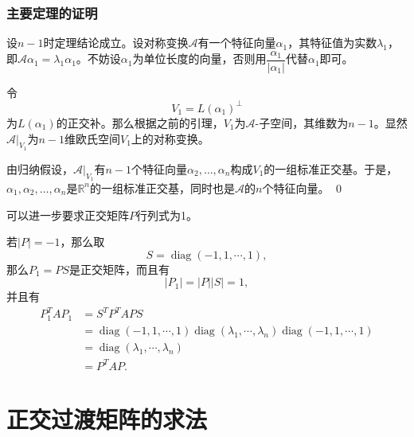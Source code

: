 \begin{frame}
\frametitle{主要定理的证明}

\startproof[bg=yellow, fg=red]
\phantom{一一}设$n-1$时定理结论成立。设对称变换$\mathscr{A}$有一个特征向量$\alpha_1$，其特征值为实数$\lambda_1$，即$\mathscr{A}\alpha_1 = \lambda_1\alpha_1$。不妨设$\alpha_1$为单位长度的向量，否则用$\displaystyle \dfrac{\alpha_1}{\lvert \alpha_1 \rvert}$代替$\alpha_1$即可。

\vspace{0.6em}
\pause

\phantom{一一}令
\[V_1 = L(\alpha_1)^\perp\]
为$L(\alpha_1)$的正交补。那么根据之前的引理，$V_1$为$\mathscr{A}$-子空间，其维数为$n-1$。显然$\mathscr{A}|_{V_1}$为$n-1$维欧氏空间$V_1$上的对称变换。

\vspace{0.6em}
\pause

\phantom{一一}由归纳假设，$\mathscr{A}|_{V_1}$有$n-1$个特征向量$\alpha_2,\ldots,\alpha_n$构成$V_1$的一组标准正交基。于是，$\alpha_1,\alpha_2,\ldots,\alpha_n$是$\mathbb{R}^n$的一组标准正交基，同时也是$\mathscr{A}$的$n$个特征向量。
\qed

\end{frame}


\begin{frame}

\begin{remark}
可以进一步要求正交矩阵$P$行列式为1。

\pause

若$\lvert P \rvert = -1$，那么取
\[S = \operatorname{diag}(-1,1,\cdots,1),\]
那么$P_1 = PS$是正交矩阵，而且有
\[\lvert P_1 \rvert = \lvert P \rvert \lvert S \rvert = 1,\]
并且有
\begin{align*}
P_1^TAP_1 & = S^T P^T A P S \\
& = \operatorname{diag}(-1,1,\cdots,1)\operatorname{diag}(\lambda_1,\cdots,\lambda_n)\operatorname{diag}(-1,1,\cdots,1) \\
& = \operatorname{diag}(\lambda_1,\cdots,\lambda_n) \\
& = P^TAP.
\end{align*}
\end{remark}

\end{frame}


\section{正交过渡矩阵的求法}

